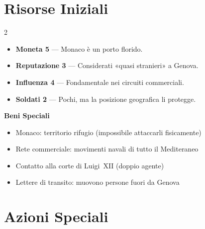 \section{Risorse Iniziali}


\begin{multicols}{2}
\begin{itemize}
  \item \textbf{Moneta 5} — Monaco è un porto florido.
  \item \textbf{Reputazione 3} — Considerati «quasi stranieri» a Genova.
  \item \textbf{Influenza 4} — Fondamentale nei circuiti commerciali.
  \item \textbf{Soldati 2} — Pochi, ma la posizione geografica li protegge.
\end{itemize}
\columnbreak
\textbf{Beni Speciali}
\begin{itemize}
  \item Monaco: territorio rifugio (impossibile attaccarli fisicamente)
  \item Rete commerciale: movimenti navali di tutto il Mediteraneo
  \item Contatto alla corte di Luigi~XII (doppio agente)
  \item Lettere di transito: muovono persone fuori da Genova
\end{itemize}
\end{multicols}

\section{Azioni Speciali}




